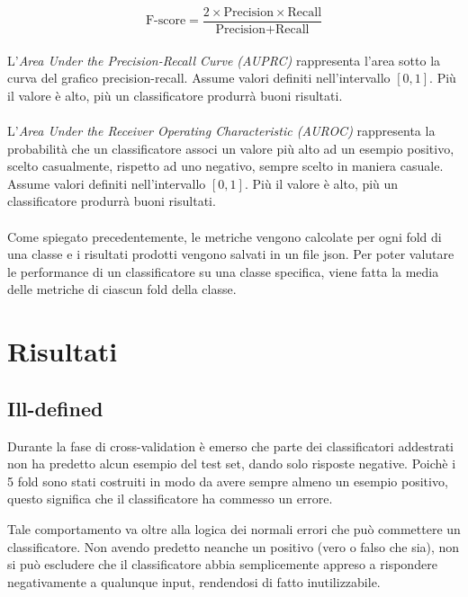 \documentclass[12pt,a4paper,oneside,hidelinks]{report}
\begin{document}
\begin{equation}
\text{F-score} = \frac{2 \times \text{Precision} \times \text{Recall}}{\text{Precision} + \text{Recall}}
\end{equation}

\paragraph*{}
L'\textit{Area Under the Precision-Recall Curve (AUPRC)} rappresenta l'area sotto la curva del grafico precision-recall. Assume valori definiti nell'intervallo $[0,1]$. Più il valore è alto, più un classificatore produrrà buoni risultati.

\paragraph*{}
L'\textit{Area Under the Receiver Operating Characteristic (AUROC)} rappresenta la probabilità che un classificatore associ un valore più alto ad un esempio positivo, scelto casualmente, rispetto ad uno negativo, sempre scelto in maniera casuale. Assume valori definiti nell'intervallo $[0,1]$. Più il valore è alto, più un classificatore produrrà buoni risultati.

\paragraph*{}
Come spiegato precedentemente, le metriche vengono calcolate per ogni fold di una classe e i risultati prodotti vengono salvati in un file json. Per poter valutare le performance di un classificatore su una classe specifica, viene fatta la media delle metriche di ciascun fold della classe.

\section{Risultati}

\subsection{Ill-defined}
Durante la fase di cross-validation è emerso che parte dei classificatori addestrati non ha predetto alcun esempio del test set, dando solo risposte negative. Poichè i 5 fold sono stati costruiti in modo da avere sempre almeno un esempio positivo, questo significa che il classificatore ha commesso un errore.

Tale comportamento va oltre alla logica dei normali errori che può commettere un classificatore. Non avendo predetto neanche un positivo (vero o falso che sia), non si può escludere che il classificatore abbia semplicemente appreso a rispondere negativamente a qualunque input, rendendosi di fatto inutilizzabile.
\end{document}
